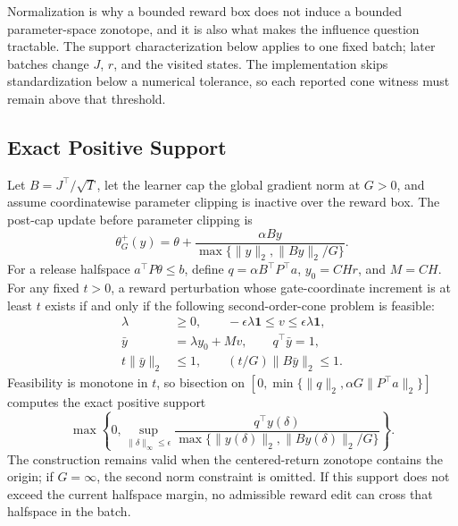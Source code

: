 Normalization is why a bounded reward box does not induce a bounded
parameter-space zonotope, and it is also what makes the influence question
tractable.  The support characterization below applies to one fixed batch;
later batches change $J$, $r$, and the visited states.  The implementation
skips standardization below a numerical tolerance, so each reported cone
witness must remain above that threshold.

\subsection{Exact Positive Support}

\begin{theorem}
\label{thm:reward-halfspace-support}
Let $B=J^\top/\sqrt T$, let the learner cap the global gradient norm at
$G>0$, and assume coordinatewise parameter clipping is inactive over the
reward box.  The post-cap update before parameter clipping is
\begin{equation}
 \theta_G^+(y)=\theta+
 \frac{\alpha By}{\max\{\|y\|_2,\|By\|_2/G\}}.
\end{equation}
For a release halfspace $a^\top P\theta\le b$, define
$q=\alpha B^\top P^\top a$, $y_0=CHr$, and $M=CH$.  For any fixed $t>0$, a
reward perturbation whose gate-coordinate increment is at least $t$ exists if
and only if the following second-order-cone problem is feasible:
\begin{equation}
\begin{split}
 \lambda&\ge0,\qquad
 -\epsilon\lambda\mathbf1\le v\le\epsilon\lambda\mathbf1,\\
 \bar y&=\lambda y_0+Mv,\qquad q^\top\bar y=1,\\
 t\|\bar y\|_2&\le1,\qquad
 (t/G)\|B\bar y\|_2\le1.
\end{split}
\label{eq:soc-support-feasibility}
\end{equation}
Feasibility is monotone in $t$, so bisection on
$[0,\min\{\|q\|_2,\alpha G\|P^\top a\|_2\}]$ computes the exact positive
support
\begin{equation}
\max\left\{0,\sup_{\|\delta\|_\infty\le\epsilon}
\frac{q^\top y(\delta)}
{\max\{\|y(\delta)\|_2,\|By(\delta)\|_2/G\}}\right\}.
\end{equation}
The construction remains valid when the centered-return zonotope contains the
origin; if $G=\infty$, the second norm constraint is omitted.  If this support
does not exceed the current halfspace margin, no admissible reward edit can
cross that halfspace in the batch.
\end{theorem}

